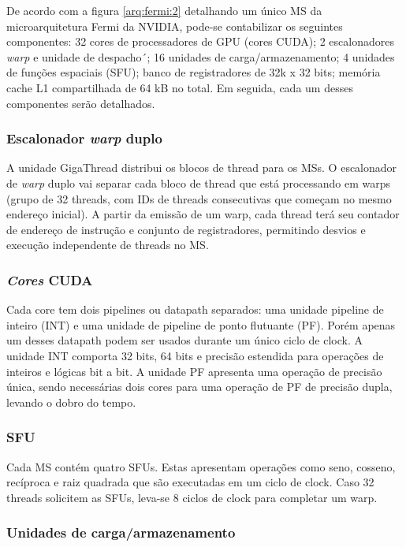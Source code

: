 De acordo com a figura \ref{arq:fermi:2} detalhando um único MS da microarquitetura Fermi da NVIDIA, pode-se contabilizar  os seguintes componentes: 32 cores de processadores de GPU (cores CUDA); 2 escalonadores \textit{warp} e unidade de despacho´; 16 unidades de carga/armazenamento; 4 unidades de funções espaciais (SFU); banco de registradores de 32k x 32 bits; memória cache L1 compartilhada de 64 kB no total. Em seguida, cada um desses componentes serão detalhados.

\subsubsection{Escalonador \textit{warp} duplo}

A unidade GigaThread distribui os blocos de thread para os MSs. O escalonador de \textit{warp} duplo vai separar cada bloco de thread que está processando em warps (grupo de 32 threads, com IDs de threads consecutivas que começam no mesmo endereço inicial). A partir da emissão de um warp, cada thread terá seu contador de endereço de instrução e conjunto de registradores, permitindo desvios e execução independente de threads no MS.

\subsubsection{\textit{Cores} CUDA}

Cada core tem dois pipelines ou datapath separados: uma unidade pipeline de inteiro (INT) e uma unidade de pipeline de ponto flutuante (PF). Porém apenas um desses datapath podem ser usados durante um único ciclo de clock. A unidade INT comporta 32 bits, 64 bits e precisão estendida para operações de inteiros e lógicas bit a bit. A unidade PF apresenta uma operação de precisão única, sendo necessárias dois cores para uma operação de PF de precisão dupla, levando o dobro do tempo.

\subsubsection{SFU}

Cada MS contém quatro SFUs. Estas apresentam operações como seno, cosseno, recíproca e raiz quadrada que são executadas em um ciclo de clock. Caso 32 threads solicitem as SFUs, leva-se 8 ciclos de clock para completar um warp.

\subsubsection{Unidades de carga/armazenamento}

